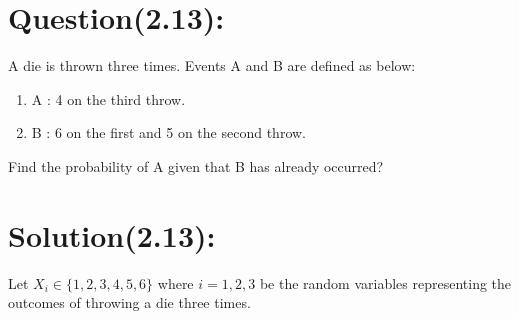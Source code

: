 \documentclass[journal,12pt,twocolumn]{IEEEtran}
\begin{document}
\section*{Question(2.13):}
 A die is thrown three times. Events A and B
are defined as below:
\begin{enumerate}
 \item A : 4 on the third throw.
 \item B : 6 on the first and 5 on the second throw.
 \end{enumerate}
Find the probability of A given that B has
already occurred?
\section*{Solution(2.13):}

Let $X_i \in \{1,2,3,4,5,6\}$ where $i=1,2,3$
be the random variables representing the outcomes of throwing a die three times.\\
\end{document}
